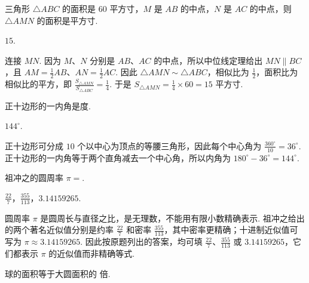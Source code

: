 \begin{problem}
三角形 \(\triangle ABC\) 的面积是 \(60\text{ 平方寸}\)，\(M\) 是 \(AB\) 的中点，\(N\) 是 \(AC\) 的中点，则 \(\triangle AMN\) 的面积是\fillinblank{}\(\text{平方寸}\).
\end{problem}

\begin{answer}
\(15\).
\end{answer}

\begin{solution}
连接 \(MN\). 因为 \(M\)、\(N\) 分别是 \(AB\)、\(AC\) 的中点，所以中位线定理给出 \(MN\parallel BC\)，且 \(AM=\frac12AB\)、\(AN=\frac12AC\). 因此 \(\triangle AMN\sim\triangle ABC\)，相似比为 \(\frac12\)，面积比为相似比的平方，即 \(\frac{S_{\triangle AMN}}{S_{\triangle ABC}}=\frac14\). 于是 \(S_{\triangle AMN}=\frac14\times60=15\text{ 平方寸}\).
\end{solution}

\begin{problem}
正十边形的一内角是\fillinblank{}\(\text{度}\).
\end{problem}

\begin{answer}
\(144^{\circ}\).
\end{answer}

\begin{solution}
正十边形可分成 \(10\) 个以中心为顶点的等腰三角形，因此每个中心角为 \(\frac{360^{\circ}}{10}=36^{\circ}\). 正十边形的一内角等于两个直角减去一个中心角，所以内角为 \(180^{\circ}-36^{\circ}=144^{\circ}\).
\end{solution}

\begin{problem}
祖冲之的圆周率 \(\pi=\)\fillinblank{}.
\end{problem}

\begin{answer}
\(\frac{22}{7}\)，\(\frac{355}{113}\)，\(3.14159265\).
\end{answer}

\begin{solution}
圆周率 \(\pi\) 是圆周长与直径之比，是无理数，不能用有限小数精确表示. 祖冲之给出的两个著名近似值分别是约率 \(\frac{22}{7}\) 和密率 \(\frac{355}{113}\)，其中密率更精确；十进制近似值可写为 \(\pi\approx3.14159265\). 因此按原题列出的答案，均可填 \(\frac{22}{7}\)、\(\frac{355}{113}\) 或 \(3.14159265\)，它们都表示 \(\pi\) 的近似值而非精确等式.
\end{solution}

\begin{problem}
球的面积等于大圆面积的\fillinblank{} 倍.
\end{problem}

